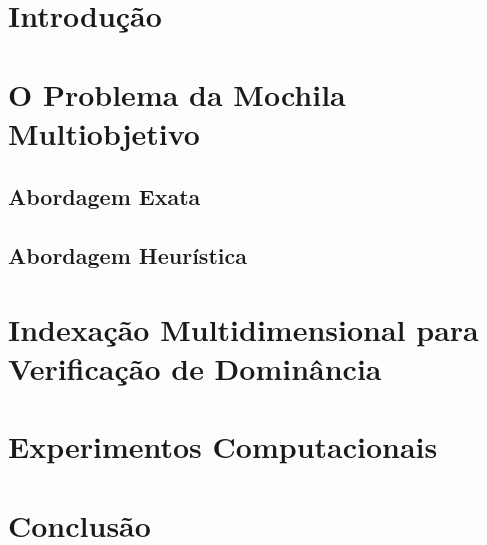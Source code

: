\documentclass[
12pt,				%
twoside,			%
a4paper,			%
portugues,			%
brazil,				%
]{abntex2}
\begin{document}
\imprimircapa
\imprimirfolhaderosto*


\newpage \phantom{a}



\tableofcontents*
\cleardoublepage

\listoffigures*
\cleardoublepage

\listoftables*
\cleardoublepage

\chapter{Introdução}


\chapter{O Problema da Mochila Multiobjetivo}
\label{cap:mokp}

\section{Abordagem Exata}
\label{sec:exato}

\section{Abordagem Heurística}
\label{sec:mh}


\chapter{Indexação Multidimensional para Verificação de Dominância}
\label{cap:kdtree}


\chapter{Experimentos Computacionais}
\label{cap:exp}


\chapter{Conclusão}
\label{cap:concl}



\postextual


\end{document}
